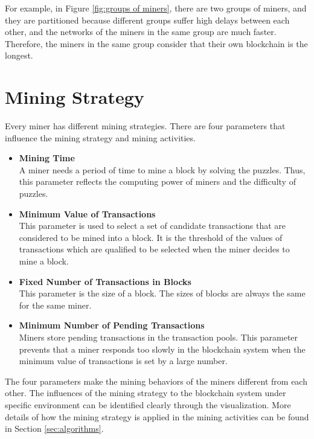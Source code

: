 For example, in Figure \ref{fig:groups of miners}, there are two groups of miners, and they are partitioned because different groups suffer high delays between each other, and the networks of the miners in the same group are much faster. Therefore, the miners in the same group consider that their own blockchain is the longest.

\clearpage

\section{Mining Strategy}

Every miner has different mining strategies. There are four parameters that influence the mining strategy and mining activities. 

\begin{itemize}
    \item \textbf{Mining Time} \\
        A miner needs a period of time to mine a block by solving the puzzles. Thus, this parameter reflects the computing power of miners and the difficulty of puzzles.
    \item \textbf{Minimum Value of Transactions} \\
        This parameter is used to select a set of candidate transactions that are considered to be mined into a block. It is the threshold of the values of transactions which are qualified to be selected when the miner decides to mine a block.
    \item \textbf{Fixed Number of Transactions in Blocks} \\
        This parameter is the size of a block. The sizes of blocks are always the same for the same miner.
    \item \textbf{Minimum Number of Pending Transactions} \\
        Miners store pending transactions in the transaction pools. This parameter prevents that a miner responds too slowly in the blockchain system when the minimum value of transactions is set by a large number.
\end{itemize}

The four parameters make the mining behaviors of the miners different from each other. The influences of the mining strategy to the blockchain system under specific environment can be identified clearly through the visualization. More details of how the mining strategy is applied in the mining activities can be found in Section \ref{sec:algorithms}.

